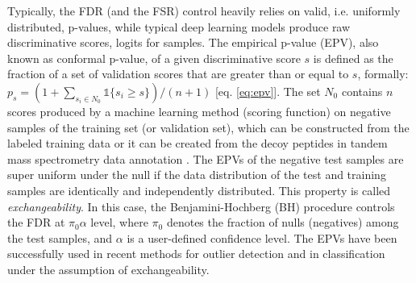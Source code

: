 \documentclass{article}
\newcommand{\mathone}{\mathds{1}}
\begin{document}
Typically, the FDR (and the FSR) control heavily relies on valid, i.e. uniformly distributed, p-values, while typical deep learning models produce raw discriminative scores, logits for samples. %
The empirical p-value (EPV), also known as conformal p-value, of a given discriminative score $s$ is defined as the fraction of a set of validation scores that are greater than or equal to $s$, formally: $p_s=(1+\sum_{s_i\in N_0} \mathone\{s_i \ge s\})/(n+1) \label{eq:epv}$ [eq. \ref{eq:epv}]. The set $N_0$ contains $n$ scores produced by a machine learning method (scoring function) on negative samples of the training set (or validation set), which can be constructed from the labeled training data or it can be created from the decoy peptides in tandem mass spectrometry data annotation \cite{elias2007target,danilova2019bias}. The EPVs of the negative test samples are super uniform under the null if the data distribution of the test and training samples are identically and independently distributed. This property is called {\em exchangeability}. In this case, the Benjamini-Hochberg (BH) procedure controls the FDR at $\pi_0\alpha$ level, where $\pi_0$ denotes the fraction of nulls (negatives) among the test samples, and $\alpha$ is a user-defined confidence level. The EPVs have been successfully used in recent methods for outlier detection \cite{bates2023testing,marandon2023adaptive} and in classification \cite{rava2021burden, angelopoulos2021learn} under the assumption of exchangeability. %
\end{document}
